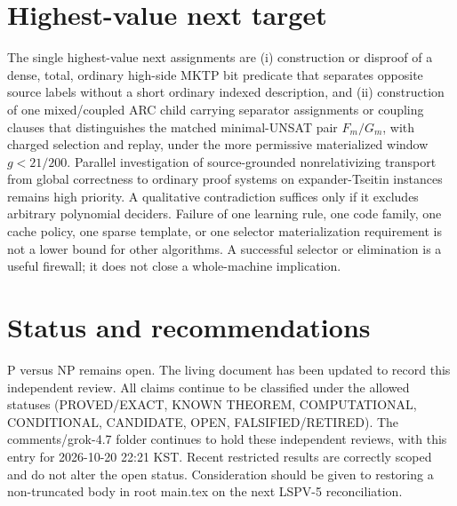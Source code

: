 \documentclass[11pt]{article}
\begin{document}
\section{Highest-value next target}
The single highest-value next assignments are (i) construction or disproof of a dense, total, ordinary high-side MKTP bit predicate that separates opposite source labels without a short ordinary indexed description, and (ii) construction of one mixed/coupled ARC child carrying separator assignments or coupling clauses that distinguishes the matched minimal-UNSAT pair \(F_m/G_m\), with charged selection and replay, under the more permissive materialized window \(g<21/200\). Parallel investigation of source-grounded nonrelativizing transport from global correctness to ordinary proof systems on expander-Tseitin instances remains high priority. A qualitative contradiction suffices only if it excludes arbitrary polynomial deciders. Failure of one learning rule, one code family, one cache policy, one sparse template, or one selector materialization requirement is not a lower bound for other algorithms. A successful selector or elimination is a useful firewall; it does not close a whole-machine implication.

\section{Status and recommendations}
P versus NP remains open. The living document has been updated to record this independent review. All claims continue to be classified under the allowed statuses (PROVED/EXACT, KNOWN THEOREM, COMPUTATIONAL, CONDITIONAL, CANDIDATE, OPEN, FALSIFIED/RETIRED). The comments/grok-4.7 folder continues to hold these independent reviews, with this entry for 2026-10-20 22:21 KST. Recent restricted results are correctly scoped and do not alter the open status. Consideration should be given to restoring a non-truncated body in root main.tex on the next LSPV-5 reconciliation.

\end{document}
